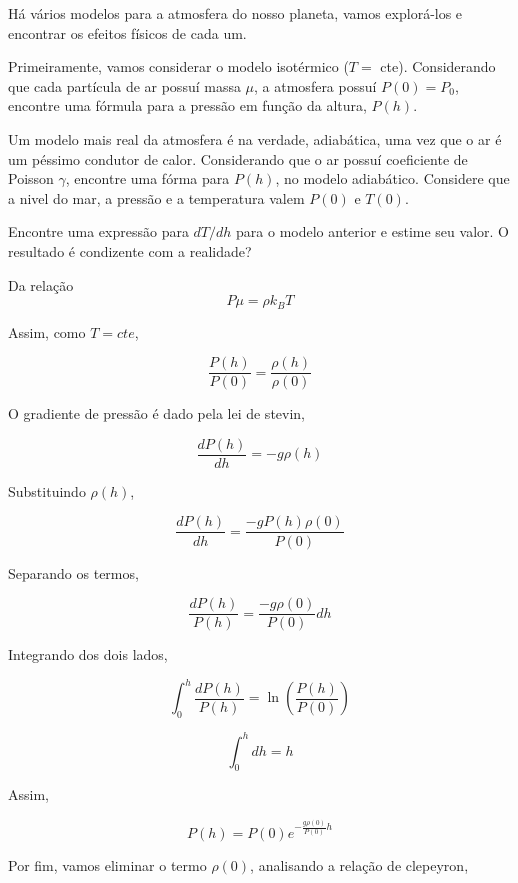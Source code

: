 \documentclass[11pt]{article}
\begin{document}
\begin{pproblem}
    Há vários modelos para a atmosfera do nosso planeta, vamos explorá-los e encontrar os efeitos físicos de cada um.
    \begin{alternativas}
        \item Primeiramente, vamos considerar o modelo isotérmico (\(T=\) cte). Considerando que cada partícula de ar possuí massa \(\mu\), a atmosfera possuí \(P(0) = P_0\), encontre uma fórmula para a pressão em função da altura, \(P(h)\).
        \item Um modelo mais real da atmosfera é na verdade, adiabática, uma vez que o ar é um péssimo condutor de calor. Considerando que o ar possuí coeficiente de Poisson \(\gamma\), encontre uma fórma para \(P(h)\), no modelo adiabático. Considere que a nivel do mar, a pressão e a temperatura valem \(P(0)\) e \(T(0)\).
        \item Encontre uma expressão para \(dT/dh\) para o modelo anterior e estime seu valor. O resultado é condizente com a realidade?
    \end{alternativas}

\begin{pssolution*}{}{}
    \begin{alternativas}
        \item Da relação 
        \[P\mu = \rho k_BT\]

        Assim, como \(T = cte\), 

        \[\frac{P(h)}{P(0)} = \frac{\rho(h)}{\rho(0)}\]

        O gradiente de pressão é dado pela lei de stevin, 

        \[\frac{dP(h)}{dh} = -g\rho(h)\]

        Substituindo \(\rho(h)\), 

        \[\frac{dP(h)}{dh} = \frac{-gP(h)\rho(0)}{P(0)}\]

        Separando os termos, 

        \[\frac{dP(h)}{P(h)} = \frac{-g\rho(0)}{P(0)}dh\]

        Integrando dos dois lados, 

        \[\int_0^h\frac{dP(h)}{P(h)} = \ln\left(\frac{P(h)}{P(0)}\right)\]

        \[\int_0^hdh = h\]

        Assim, 

        \[P(h) = P(0)e^{-\frac{g\rho(0)}{P(0)}h}\]

        Por fim, vamos eliminar o termo \(\rho(0)\), analisando a relação de clepeyron, 


\end{alternativas}
\end{pssolution*}
\end{pproblem}
\end{document}
